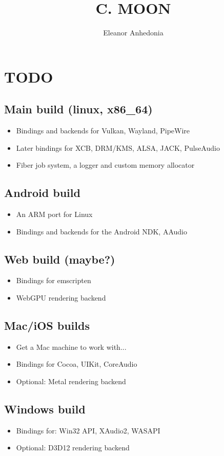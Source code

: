 \documentclass[]{cmoon}
\title{C. MOON}
\author{Eleanor Anhedonia}
\begin{document}
\maketitle
\tableofcontents

\section{TODO}
\subsection{Main build (linux, x86\_64)}
\begin{itemize}
    \item Bindings and backends for Vulkan, Wayland, PipeWire
    \item Later bindings for XCB, DRM/KMS, ALSA, JACK, PulseAudio
    \item Fiber job system, a logger and custom memory allocator
\end{itemize}

\subsection{Android build}
\begin{itemize}
    \item An ARM port for Linux
    \item Bindings and backends for the Android NDK, AAudio
\end{itemize}

\subsection{Web build (maybe?)}
\begin{itemize}
    \item Bindings for emscripten
    \item WebGPU rendering backend
\end{itemize}

\subsection{Mac/iOS builds}
\begin{itemize}
    \item Get a Mac machine to work with...
    \item Bindings for Cocoa, UIKit, CoreAudio
    \item Optional: Metal rendering backend
\end{itemize}

\subsection{Windows build}
\begin{itemize}
    \item Bindings for: Win32 API, XAudio2, WASAPI
    \item Optional: D3D12 rendering backend
\end{itemize}
\end{document}
